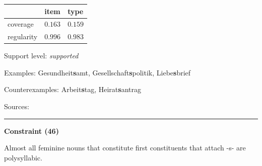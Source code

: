 \vspace{-0.25em}

\begin{table}[!ht]
\begin{center}
\setlength{\extrarowheight}{1pt}
\begin{tabularx}{\columnwidth}{|X|X|X|}
\hline
 & item & type \\
\hline
 coverage & $0.163$ & $0.159$ \\
\hline
 regularity & $0.996$ & $0.983$ \\
\hline
\end{tabularx}
\end{center}
\end{table}

\vspace{-1.35em}

\noindent
Support level: \textit{supported}

\vspace{0.3em}

\noindent
Examples: Gesundheit\textbf{s}amt, Gesellschaft\textbf{s}politik, Liebe\textbf{s}brief

\noindent
Counterexamples: Arbeit\textbf{s}tag, Heirat\textbf{s}antrag

\vspace{0.3em}

\noindent
Sources: \citet[23, 24]{kuerschner_2010}

\vspace{0.35em}
\hrule




\vspace{0.4em}

\begin{center}
\textbf{Constraint (46)}
\end{center}

\noindent
Almost all feminine nouns that constitute first constituents that attach -s- are polysyllabic.
\vspace{0.5em}


